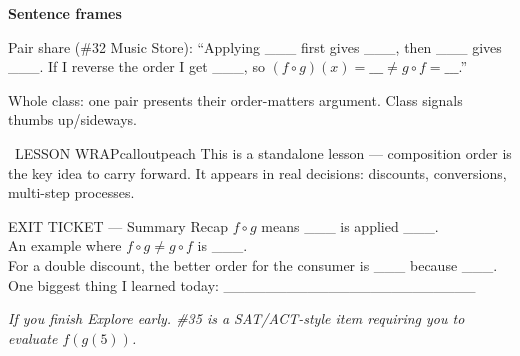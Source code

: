 \documentclass[11pt]{article}
\begin{document}

\begin{sentenceframebox}
\textbf{Sentence frames}

Pair share (\#32 Music Store): ``Applying \_\_\_ first gives \_\_\_, then \_\_\_ gives \_\_\_. If I reverse the order I get \_\_\_, so \((f\circ g)(x) = \_\_\_ \neq g\circ f = \_\_\_\).''

Whole class: one pair presents their order-matters argument. Class signals thumbs up/sideways.
\end{sentenceframebox}

\begin{callout}{\IconSearch\ LESSON WRAP}{calloutpeach}
This is a standalone lesson --- composition order is the key idea to carry forward. It appears in real decisions: discounts, conversions, multi-step processes.
\end{callout}


\begin{summaryexitbox}{EXIT TICKET --- Summary Recap}
\(f\circ g\) means \_\_\_ is applied \_\_\_.\\[0.55em]
An example where \(f\circ g \neq g\circ f\) is \_\_\_.\\[0.55em]
For a double discount, the better order for the consumer is \_\_\_ because \_\_\_.\\[0.55em]
One biggest thing I learned today: \_\_\_\_\_\_\_\_\_\_\_\_\_\_\_\_\_\_\_\_\_\_\_\_
\end{summaryexitbox}

\clearpage

\textit{If you finish Explore early. \#35 is a SAT/ACT-style item requiring you to evaluate \(f(g(5))\).}

\end{document}
